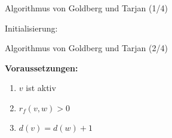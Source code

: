 \documentclass[aspectratio=169]{beamer}
\begin{document}
\begin{frame}{Algorithmus von Goldberg und Tarjan (1/4)}

  Initialisierung:

  \begin{algorithmus*}
    \begin{algorithm}[H]
      \begin{algorithmic}[1]
          \State {}
          \EndProcedure
      \end{algorithmic}
    \end{algorithm}
  \end{algorithmus*}
  
\end{frame}

\begin{frame}{Algorithmus von Goldberg und Tarjan (2/4)}

  \begin{algorithmus*}
    \begin{algorithm}[H]
      \begin{algorithmic}[1]
          \EndProcedure
      \end{algorithmic}
      \textbf{Voraussetzungen:} 
        \begin{enumerate}
          \item $v$ ist aktiv
          \item $r_f(v,w) > 0$
          \item $d(v) = d(w) + 1$
        \end{enumerate}
    \end{algorithm}
  \end{algorithmus*}
  
\end{frame}
\end{document}
